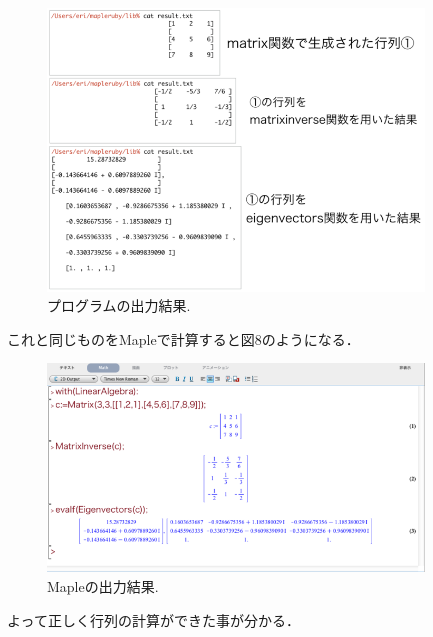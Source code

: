 \begin{figure}[htbp]\begin{center}
\includegraphics[width=10cm,bb= 0 0 737 553]{../figs/./mapleruby_eringi.008.png}
\caption{プログラムの出力結果.}
\label{default}\end{center}\end{figure}
\newpage
これと同じものをMapleで計算すると図8のようになる．

\begin{figure}[htbp]\begin{center}
\includegraphics[width=10cm,bb= 0 0 737 553]{../figs/./mapleruby_eringi.exmaple.png}
\caption{Mapleの出力結果.}
\label{default}\end{center}\end{figure}
よって正しく行列の計算ができた事が分かる．

